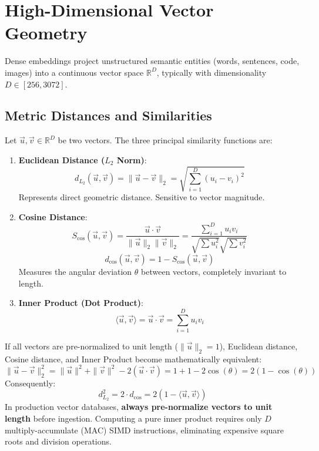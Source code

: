 \section{High-Dimensional Vector Geometry}

Dense embeddings project unstructured semantic entities (words, sentences, code, images) into a continuous vector space $\mathbb{R}^D$, typically with dimensionality $D \in [256, 3072]$.

\subsection{Metric Distances and Similarities}
Let $\vec{u}, \vec{v} \in \mathbb{R}^D$ be two vectors. The three principal similarity functions are:

\begin{enumerate}[leftmargin=18pt]
  \item \textbf{Euclidean Distance ($L_2$ Norm)}:
  \begin{equation}
  d_{L_2}(\vec{u}, \vec{v}) = \|\vec{u} - \vec{v}\|_2 = \sqrt{\sum_{i=1}^D (u_i - v_i)^2}
  \end{equation}
  Represents direct geometric distance. Sensitive to vector magnitude.

  \item \textbf{Cosine Distance}:
  \begin{equation}
  S_{\cos}(\vec{u}, \vec{v}) = \frac{\vec{u} \cdot \vec{v}}{\|\vec{u}\|_2 \|\vec{v}\|_2} = \frac{\sum_{i=1}^D u_i v_i}{\sqrt{\sum u_i^2} \sqrt{\sum v_i^2}}
  \end{equation}
  \begin{equation}
  d_{\cos}(\vec{u}, \vec{v}) = 1 - S_{\cos}(\vec{u}, \vec{v})
  \end{equation}
  Measures the angular deviation $\theta$ between vectors, completely invariant to length.

  \item \textbf{Inner Product (Dot Product)}:
  \begin{equation}
  \langle \vec{u}, \vec{v} \rangle = \vec{u} \cdot \vec{v} = \sum_{i=1}^D u_i v_i
  \end{equation}
\end{enumerate}

\begin{intuitionbox}
If all vectors are pre-normalized to unit length ($\|\vec{u}\|_2 = 1$), Euclidean distance, Cosine distance, and Inner Product become mathematically equivalent:
\begin{equation}
\|\vec{u} - \vec{v}\|_2^2 = \|\vec{u}\|^2 + \|\vec{v}\|^2 - 2(\vec{u} \cdot \vec{v}) = 1 + 1 - 2\cos(\theta) = 2(1 - \cos(\theta))
\end{equation}
Consequently:
\begin{equation}
d_{L_2}^2 = 2 \cdot d_{\cos} = 2(1 - \langle \vec{u}, \vec{v} \rangle)
\end{equation}
In production vector databases, \textbf{always pre-normalize vectors to unit length} before ingestion. Computing a pure inner product requires only $D$ multiply-accumulate (MAC) SIMD instructions, eliminating expensive square roots and division operations.
\end{intuitionbox}

